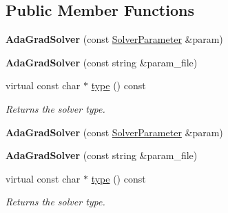 \subsection*{Public Member Functions}
\begin{DoxyCompactItemize}
\item 
\mbox{\label{classcaffe_1_1_ada_grad_solver_acfa678395af17eb9cfcf21e8b9fe5ce9}} 
{\bfseries Ada\+Grad\+Solver} (const \mbox{\hyperlink{classcaffe_1_1_solver_parameter}{Solver\+Parameter}} \&param)
\item 
\mbox{\label{classcaffe_1_1_ada_grad_solver_aca70c4ae0d471a6a2610d371e95f5ffa}} 
{\bfseries Ada\+Grad\+Solver} (const string \&param\+\_\+file)
\item 
\mbox{\label{classcaffe_1_1_ada_grad_solver_a8d1731c3c53568344ba2745e3d9aa8d9}} 
virtual const char $\ast$ \mbox{\hyperlink{classcaffe_1_1_ada_grad_solver_a8d1731c3c53568344ba2745e3d9aa8d9}{type}} () const
\begin{DoxyCompactList}\small\item\em Returns the solver type. \end{DoxyCompactList}\item 
\mbox{\label{classcaffe_1_1_ada_grad_solver_acfa678395af17eb9cfcf21e8b9fe5ce9}} 
{\bfseries Ada\+Grad\+Solver} (const \mbox{\hyperlink{classcaffe_1_1_solver_parameter}{Solver\+Parameter}} \&param)
\item 
\mbox{\label{classcaffe_1_1_ada_grad_solver_aca70c4ae0d471a6a2610d371e95f5ffa}} 
{\bfseries Ada\+Grad\+Solver} (const string \&param\+\_\+file)
\item 
\mbox{\label{classcaffe_1_1_ada_grad_solver_a8d1731c3c53568344ba2745e3d9aa8d9}} 
virtual const char $\ast$ \mbox{\hyperlink{classcaffe_1_1_ada_grad_solver_a8d1731c3c53568344ba2745e3d9aa8d9}{type}} () const
\begin{DoxyCompactList}\small\item\em Returns the solver type. \end{DoxyCompactList}\end{DoxyCompactItemize}
